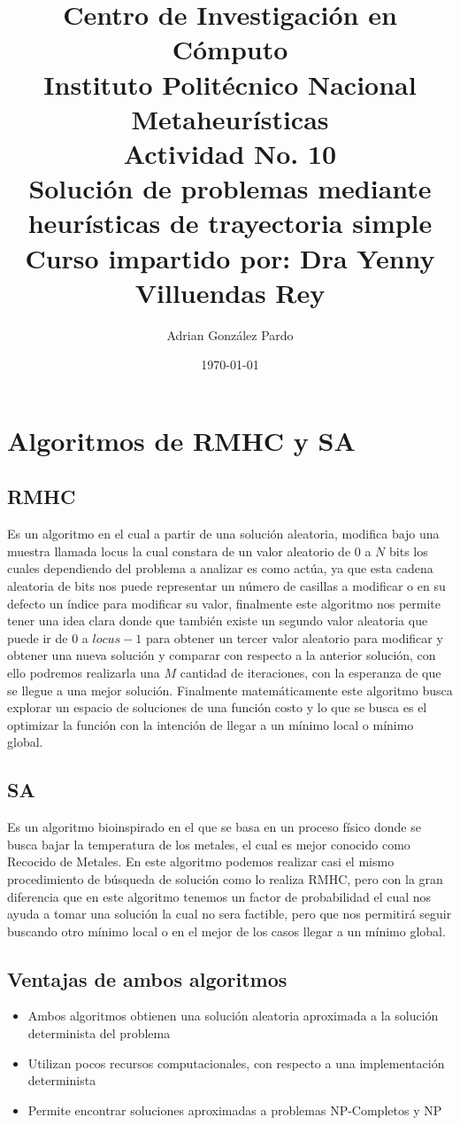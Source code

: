 \documentclass[10pt]{article}
\title{Centro de Investigación en Cómputo\\Instituto Politécnico Nacional\\Metaheurísticas\\Actividad No. 10\\ Solución de problemas mediante heurísticas de trayectoria simple\\Curso impartido por: Dra Yenny Villuendas Rey}
\author{Adrian González Pardo}
\date{\today}
\begin{document}
\maketitle
\section{Algoritmos de RMHC y SA}
\subsection{RMHC}
Es un algoritmo en el cual a partir de una solución aleatoria, modifica bajo una muestra llamada locus la cual constara de un valor aleatorio de $0$ a $N$ bits los cuales dependiendo del problema a analizar es como actúa, ya que esta cadena aleatoria de bits nos puede representar un número de casillas a modificar o en su defecto un índice para modificar su valor, finalmente este algoritmo nos permite tener una idea clara donde que también existe un segundo valor aleatoria que puede ir de $0$ a $locus-1$ para obtener un tercer valor aleatorio para modificar y obtener una nueva solución y comparar con respecto a la anterior solución, con ello podremos realizarla una $M$ cantidad de iteraciones, con la esperanza de que se llegue a una mejor solución. Finalmente matemáticamente este algoritmo busca explorar un espacio de soluciones de una función costo y lo que se busca es el optimizar la función con la intención de llegar a un mínimo local o mínimo global.
\subsection{SA}
Es un algoritmo bioinspirado en el que se basa en un proceso físico donde se busca bajar la temperatura de los metales, el cual es mejor conocido como Recocido de Metales. En este algoritmo podemos realizar casi el mismo procedimiento de búsqueda de solución como lo realiza RMHC, pero con la gran diferencia que en este algoritmo tenemos un factor de probabilidad el cual nos ayuda a tomar una solución la cual no sera factible, pero que nos permitirá seguir buscando otro mínimo local o en el mejor de los casos llegar a un mínimo global.
\subsection{Ventajas de ambos algoritmos}
\begin{itemize}
  \item Ambos algoritmos obtienen una solución aleatoria aproximada a la solución determinista del problema
  \item Utilizan pocos recursos computacionales, con respecto a una implementación determinista
  \item Permite encontrar soluciones aproximadas a problemas NP-Completos y NP
\end{itemize}
\end{document}
